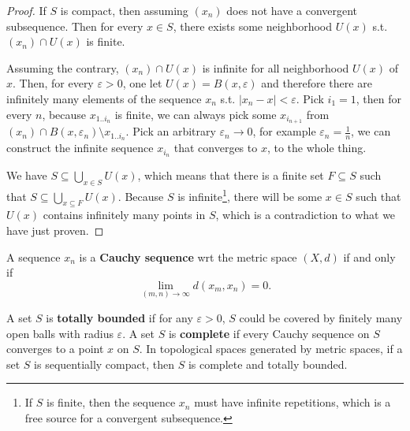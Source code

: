 \begin{proof}
  If \( S \) is compact, then assuming \( (x_{n}) \) does not have a convergent
  subsequence. Then for every \( x \in S \), there exists some neighborhood \(
  U(x) \) s.t. \( (x_{n}) \cap  U(x) \) is finite.

  Assuming the contrary, \( (x_{n}) \cap U(x) \) is infinite for all
  neighborhood \( U(x) \) of \( x \). Then, for every \( \varepsilon > 0 \), one
  let \( U(x) = B(x, \varepsilon) \) and therefore there are infinitely many
  elements of the sequence \( x_{n} \) s.t. \( |x_{n} - x| < \varepsilon \).
  Pick \( i_{1} = 1 \), then for every \( n \), because \( x_{1 .. i_{n}} \) is
  finite, we can always pick some \( x_{i_{n+1}} \) from \( (x_{n}) \cap  B(x,
  \varepsilon_{n}) \setminus x_{1 .. i_{n}} \). Pick an arbitrary \(
  \varepsilon_{n} \to 0 \), for example \( \varepsilon_{n} = \frac{1}{n} \), we
  can construct the infinite sequence \( x_{i_{n}} \) that converges to \( x \),
  to the whole thing.

  We have \( S \subseteq \bigcup_{x \in S} U(x) \), which means that there is a
  finite set \( F \subseteq S \) such that \( S \subseteq \bigcup_{x \subseteq
  F} U(x) \). Because \( S \) is infinite\footnote{If \( S \) is finite, then
  the sequence \( x_{n} \) must have infinite repetitions, which is a free
  source for a convergent subsequence.}, there will be some \( x \in S \) such
  that \( U(x) \) contains infinitely many points in \( S \), which is a
  contradiction to what we have just proven.
\end{proof}

\begin{theorem}
  A sequence \( x_{n} \) is a \textbf{Cauchy sequence} wrt the
  metric space \( (X, d) \) if and only if
  \[
    \lim_{(m, n) \to  \infty} d(x_{m}, x_{n}) = 0
  .\]

  A set \( S \) is \textbf{totally bounded} if for any \( \varepsilon > 0 \), \( S \)
  could be covered by finitely many open balls with radius \( \varepsilon \).
  A set \( S \) is \textbf{complete} if every Cauchy sequence on \( S \)
  converges to a point \( x \) on \( S \).
  In topological spaces generated by metric spaces, if a set \( S \) is
  sequentially compact, then \( S \) is complete and totally bounded.

\end{theorem}

